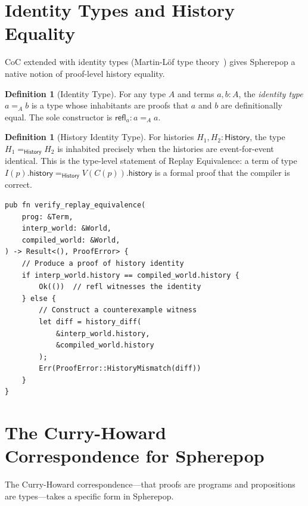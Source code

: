 \documentclass[12pt, a4paper, openany]{book}
\theoremstyle{plain}
\theoremstyle{definition}
\newtheorem{definition}[theorem]{Definition}
\theoremstyle{remark}
\begin{document}
\section{Identity Types and History Equality}

CoC extended with identity types (Martin-L\"of type theory~\cite{martinlof84})
gives Spherepop a native notion of proof-level history equality.

\begin{definition}[Identity Type]
For any type $A$ and terms $a, b : A$, the \emph{identity type} $a =_A b$ is a
type whose inhabitants are proofs that $a$ and $b$ are definitionally equal.
The sole constructor is $\mathsf{refl}_a : a =_A a$.
\end{definition}

\begin{definition}[History Identity Type]
For histories $H_1, H_2 : \mathsf{History}$, the type $H_1 =_{\mathsf{History}} H_2$
is inhabited precisely when the histories are event-for-event identical. This is
the type-level statement of Replay Equivalence: a term of type
$I(p).\mathsf{history} =_{\mathsf{History}} V(C(p)).\mathsf{history}$
is a formal proof that the compiler is correct.
\end{definition}

\begin{lstlisting}[style=rust, caption={History identity in the type system}]
pub fn verify_replay_equivalence(
    prog: &Term,
    interp_world: &World,
    compiled_world: &World,
) -> Result<(), ProofError> {
    // Produce a proof of history identity
    if interp_world.history == compiled_world.history {
        Ok(())  // refl witnesses the identity
    } else {
        // Construct a counterexample witness
        let diff = history_diff(
            &interp_world.history,
            &compiled_world.history
        );
        Err(ProofError::HistoryMismatch(diff))
    }
}
\end{lstlisting}

\section{The Curry-Howard Correspondence for Spherepop}

The Curry-Howard correspondence---that proofs are programs and propositions are
types---takes a specific form in Spherepop.
\end{document}
